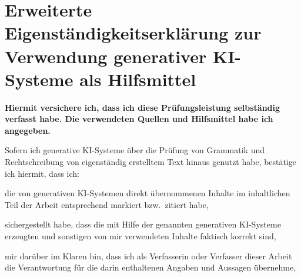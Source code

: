 

\clearpage

\newcommand{\ankreuz}{%
  \makebox[1em][l]{%
    $\square$\hspace{-0.66em}\raisebox{0.25ex}{\scriptsize$\checkmark$}%
  }%
}

\chapter*{Erweiterte Eigenständigkeitserklärung zur Verwendung generativer
KI-Systeme als Hilfsmittel}


\begin{mdframed}[linewidth=1pt, innerleftmargin=8pt, innerrightmargin=8pt,
                 innertopmargin=6pt, innerbottommargin=6pt]
\textbf{Hiermit versichere ich, dass ich diese Prüfungsleistung selbständig
verfasst habe. Die verwendeten Quellen und Hilfsmittel habe ich angegeben.}
\end{mdframed}

\vspace{0.6cm}

Sofern ich generative KI-Systeme über die Prüfung von Grammatik und
Rechtschreibung von eigenständig erstelltem Text hinaus genutzt habe,
bestätige ich hiermit, dass ich:

\vspace{0.5cm}

\noindent\ankreuz\quad die von generativen KI-Systemen direkt übernommenen
Inhalte im inhaltlichen Teil der Arbeit entsprechend markiert bzw.\ zitiert
habe,

\vspace{0.5cm}

\noindent\ankreuz\quad sichergestellt habe, dass die mit Hilfe der genannten
generativen KI-Systeme erzeugten und sonstigen von mir verwendeten Inhalte
faktisch korrekt sind,

\vspace{0.5cm}

\noindent\ankreuz\quad mir darüber im Klaren bin, dass ich als Verfasserin
oder Verfasser dieser Arbeit die Verantwortung für die darin enthaltenen
Angaben und Aussagen übernehme,

